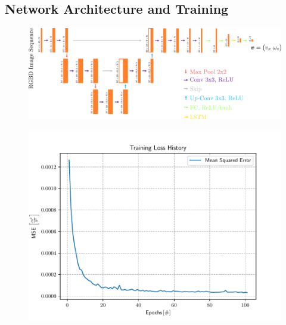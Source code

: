 \subsection{Network Architecture and Training}
\begin{figure}[h]
	\centering
	\includegraphics[scale=.5]{chapters/05_experiments/04_autonomous_walking/unet.png}
	\caption{}
	\label{fig::542_unet}
\end{figure}
\begin{figure}[h]
	\centering
	\includegraphics[scale=.6]{chapters/05_experiments/04_autonomous_walking/05_07_19_loss_history.pdf}
	\caption{}
	\label{fig::542_loss}
\end{figure}
